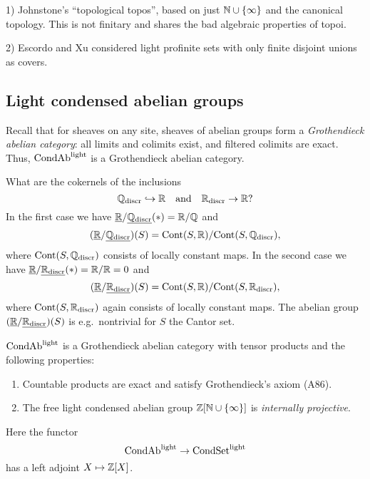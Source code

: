 \documentclass{notes}
\begin{document}
\begin{rem}
1) Johnstone's ``topological topos'', based on just ${\mathbb{N}}\cup\{\infty\}$
and the canonical topology. This is not finitary and shares the bad
algebraic properties of topoi. 

2) Escordo and Xu considered light profinite sets with only finite
disjoint unions as covers. 
\end{rem}

\subsection{Light condensed abelian groups}

Recall that for sheaves on any site, sheaves of abelian groups form a
{\em Grothendieck abelian category}: all limits and colimits exist,
and filtered colimits are exact. 
Thus, $\text{CondAb}^{\rm light}$ is a Grothendieck abelian category. 

\begin{example}
What are the cokernels of the inclusions
$$
  {\mathbb{Q}}_{\rm discr}\hookrightarrow{\mathbb{R}} \quad\text{and}\quad {\mathbb{R}}_{\rm discr}\to {\mathbb{R}}?
$$
In the first case we have $\underline{{\mathbb{R}}}/\underline{{\mathbb{Q}}_{\rm discr}}(*)={\mathbb{R}}/{\mathbb{Q}}$ and 
$$
  (\underline{{\mathbb{R}}}/\underline{{\mathbb{Q}}_{\rm discr}})(S) = {\rm Cont}(S,{\mathbb{R}})/{\rm Cont}(S,{\mathbb{Q}}_{\rm discr}),
$$
where ${\rm Cont}(S,{\mathbb{Q}}_{\rm discr})$ consists of locally constant maps.
In the second case we have $\underline{{\mathbb{R}}}/\underline{{\mathbb{R}}_{\rm discr}}(*)={\mathbb{R}}/{\mathbb{R}}=0$ and 
$$
  (\underline{{\mathbb{R}}}/\underline{{\mathbb{R}}_{\rm discr}})(S) = {\rm Cont}(S,{\mathbb{R}})/{\rm Cont}(S,{\mathbb{R}}_{\rm discr}),
$$
where ${\rm Cont}(S,{\mathbb{R}}_{\rm discr})$ again consists of locally constant maps.
The abelian group $(\underline{{\mathbb{R}}}/\underline{{\mathbb{R}}_{\rm discr}})(S)$ is e.g.~nontrivial for
$S$ the Cantor set.
\end{example}

\begin{thm}
$\text{CondAb}^{\rm light}$ is a Grothendieck abelian category with
  tensor products and the following properties:
\begin{enumerate}
\item Countable products are exact and satisfy Grothendieck's axiom
  (A86).
\item The free light condensed abelian group ${\mathbb{Z}}[{\mathbb{N}}\cup\{\infty\}]$ is
  {\em internally projective}. 
\end{enumerate}
\end{thm}

Here the functor 
$$
  \text{CondAb}^{\rm light} \to \text{CondSet}^{\rm light}
$$
has a left adjoint $X\mapsto {\mathbb{Z}}[X]$. 
  
\printbibliography
\end{document}
